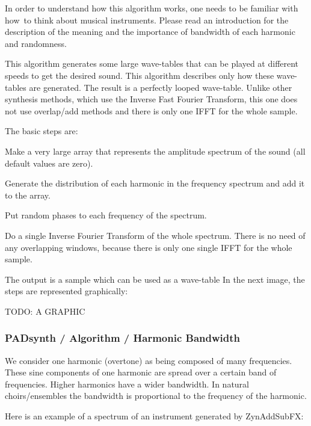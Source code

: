    In order to understand how this algorithm works, one needs to be familiar
   with how to think about musical instruments. Please read an introduction
   for the description of the meaning and the importance of bandwidth of each
   harmonic and randomness.

   This algorithm generates some large wave-tables that can be played at
   different speeds to get the desired sound. This algorithm describes only
   how these wave-tables are generated. The result is a perfectly looped
   wave-table.  Unlike other synthesis methods, which use the
   Inverse Fast Fourier Transform, this one does not use overlap/add methods
   and there is only one IFFT for the whole sample.

   The basic steps are:

   \begin{enumber}
      \item Make a very large array that represents the amplitude spectrum of
         the sound (all default values are zero).
      \item Generate the distribution of each harmonic in the frequency
         spectrum and add it to the array.
      \item Put random phases to each frequency of the spectrum.
      \item Do a single Inverse Fourier Transform of the whole spectrum. There
         is no need of any overlapping windows, because there is only one
         single IFFT for the whole sample. 
   \end{enumber}

   The output is a sample which can be used as a wave-table In the next image,
   the steps are represented graphically:

      TODO:  A GRAPHIC

\subsubsection{PADsynth / Algorithm / Harmonic Bandwidth}
\label{subsubsec:padsynth_algorithm_harmonic_bandwidth}

   We consider one harmonic (overtone) as being composed of many frequencies.
   These sine components of one harmonic are spread over a certain band of
   frequencies.  Higher harmonics have a wider bandwidth. In natural
   choirs/ensembles the bandwidth is proportional to the frequency of the
   harmonic.
   
   Here is an example of a spectrum of an instrument generated by ZynAddSubFX:

